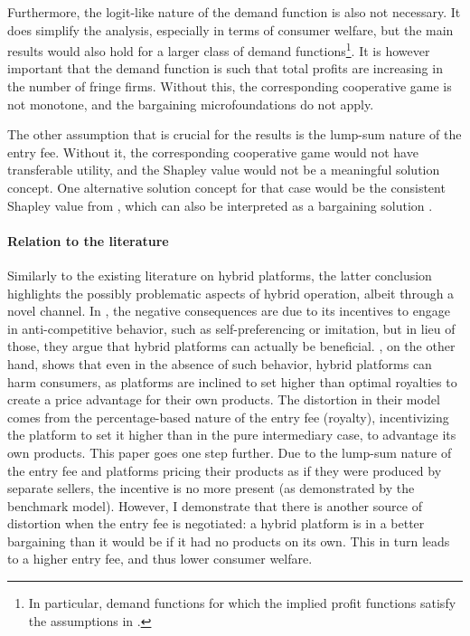 \documentclass[a4paper]{article}
\begin{document}
Furthermore, the logit-like nature of the demand function is also not necessary.
It does simplify the analysis, especially in terms of consumer welfare, but the main results would also hold for a larger class of demand functions\footnote{
    In particular, demand functions for which the implied profit functions satisfy the assumptions in .
}.
It is however important that the demand function is such that total profits are increasing in the number of fringe firms.
Without this, the corresponding cooperative game is not monotone, and the bargaining microfoundations do not apply.

The other assumption that is crucial for the results is the lump-sum nature of the entry fee.
Without it, the corresponding cooperative game would not have transferable utility, and the Shapley value would not be a meaningful solution concept.
One alternative solution concept for that case would be the consistent Shapley value from \textcite{maschler1992consistent}, which can also be interpreted as a bargaining solution \parencite{hart1996bargaining}.

\paragraph{Relation to the literature}
Similarly to the existing literature on hybrid platforms, the latter conclusion highlights the possibly problematic aspects of hybrid operation, albeit through a novel channel.
In \textcite{hagiu2022should}, the negative consequences are due to its incentives to engage in anti-competitive behavior, such as self-preferencing or imitation, but in lieu of those, they argue that hybrid platforms can actually be beneficial.
\textcite{anderson2021hybrid}, on the other hand, shows that even in the absence of such behavior, hybrid platforms can harm consumers, as platforms are inclined to set higher than optimal royalties to create a price advantage for their own products.
The distortion in their model comes from the percentage-based nature of the entry fee (royalty), incentivizing the platform to set it higher than in the pure intermediary case, to advantage its own products.
This paper goes one step further.
Due to the lump-sum nature of the entry fee and platforms pricing their products as if they were produced by separate sellers, the incentive is no more present (as demonstrated by the benchmark model).
However, I demonstrate that there is another source of distortion when the entry fee is negotiated: a hybrid platform is in a better bargaining than it would be if it had no products on its own.
This in turn leads to a higher entry fee, and thus lower consumer welfare.
\end{document}
